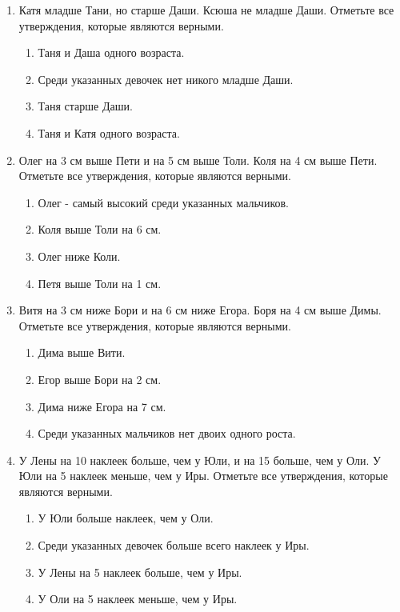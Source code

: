 \documentclass[a4paper,12pt]{article}
\newcommand{\taskspace}{\par\vspace{0.42cm}}
\begin{document}
\begin{enumerate}[resume]

\item Катя младше Тани, но старше Даши. Ксюша не младше Даши. Отметьте все утверждения, которые являются верными.
\begin{enumerate}[label=\arabic*),leftmargin=8mm,itemsep=0.25em,topsep=0.35em]
\item Таня и Даша одного возраста.
\item Среди указанных девочек нет никого младше Даши.
\item Таня старше Даши.
\item Таня и Катя одного возраста.
\end{enumerate}

\taskspace

\item Олег на 3 см выше Пети и на 5 см выше Толи. Коля на 4 см выше Пети. Отметьте все утверждения, которые являются верными.
\begin{enumerate}[label=\arabic*),leftmargin=8mm,itemsep=0.25em,topsep=0.35em]
\item Олег - самый высокий среди указанных мальчиков.
\item Коля выше Толи на 6 см.
\item Олег ниже Коли.
\item Петя выше Толи на 1 см.
\end{enumerate}

\taskspace

\item Витя на 3 см ниже Бори и на 6 см ниже Егора. Боря на 4 см выше Димы. Отметьте все утверждения, которые являются верными.
\begin{enumerate}[label=\arabic*),leftmargin=8mm,itemsep=0.25em,topsep=0.35em]
\item Дима выше Вити.
\item Егор выше Бори на 2 см.
\item Дима ниже Егора на 7 см.
\item Среди указанных мальчиков нет двоих одного роста.
\end{enumerate}

\taskspace

\item У Лены на 10 наклеек больше, чем у Юли, и на 15 больше, чем у Оли. У Юли на 5 наклеек меньше, чем у Иры. Отметьте все утверждения, которые являются верными.
\begin{enumerate}[label=\arabic*),leftmargin=8mm,itemsep=0.25em,topsep=0.35em]
\item У Юли больше наклеек, чем у Оли.
\item Среди указанных девочек больше всего наклеек у Иры.
\item У Лены на 5 наклеек больше, чем у Иры.
\item У Оли на 5 наклеек меньше, чем у Иры.
\end{enumerate}


\end{enumerate}
\end{document}
